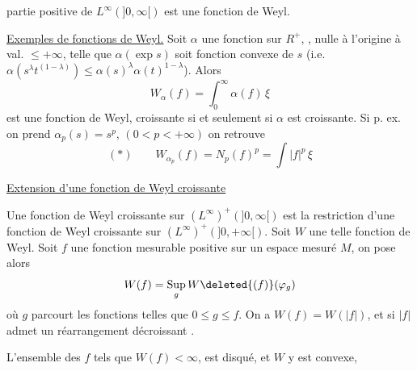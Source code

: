 partie positive de $L^{\infty}(]0,\infty[)$  est une fonction de Weyl.

\uline{Exemples de fonctions de Weyl.} Soit $\alpha$ une fonction sur $R^+$, , nulle à l'origine à val. $\leq +\infty$,  telle que $\alpha(\exp s)$ soit fonction convexe de $s$ (i.e. $\alpha(s^\lambda t^{(1-\lambda)})\leq\alpha(s)^\lambda\alpha(t)^{1-\lambda}$). Alors
\[
W_\alpha(f)=\int_0^\infty\alpha(f)\,\xi
\]
est une fonction de Weyl, croissante si et seulement si $\alpha$ est croissante. Si p. ex. on prend $\alpha_p(s)=s^p$, $(0<p<+\infty)$ on retrouve
\[
(*)\qquad W_{\alpha_p}(f)=N_p(f)^p=\int|f|^p\,\xi
\]

\uline{Extension d'une fonction de Weyl croissante}

Une fonction de Weyl croissante sur $(L^\infty)^+(]0,\infty[)$ est  la restriction d'une fonction de Weyl croissante sur $(L^{\infty})^+(]0,+\infty[)$.  Soit $W$ une telle fonction de Weyl. Soit $f$ une fonction mesurable positive sur un espace mesuré $M$, on  pose alors
\[
W(f)=\mathop{\rm Sup}_g W\deleted{(f)}(\varphi_g)
\]
où $g$ parcourt les fonctions   telles que $0\leq g\leq f$. On a  $W(f)=W(|f|)$, et si $|f|$ admet un réarrangement décroissant .

L'ensemble des $f$ tels que $W(f)<\infty$, est  disqué, et $W$ y est convexe,
